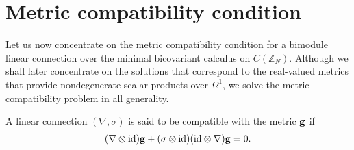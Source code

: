 \documentclass[10pt,a4paper]{amsart}
\numberwithin{equation}{section}
\newcommand{\Z}{\mathbb{Z}}
\begin{document}
\section{Metric compatibility condition}
Let us now concentrate on the metric compatibility condition for a bimodule linear connection over
the minimal bicovariant calculus on $C(\Z_N)$. Although we shall later concentrate on the solutions that correspond to the real-valued metrics that provide nondegenerate scalar products over $\Omega^1$, we solve the metric compatibility
problem in all generality.

\begin{Definition}
A linear connection $(\nabla,\sigma)$ is said to be compatible with the metric ${\bf g}$ if
\begin{equation*}
(\nabla\otimes\mathrm{id}){\bf g}+(\sigma\otimes\mathrm{id})(\mathrm{id}\otimes\nabla){\bf g}=0.
\end{equation*}
\end{Definition}
\end{document}
